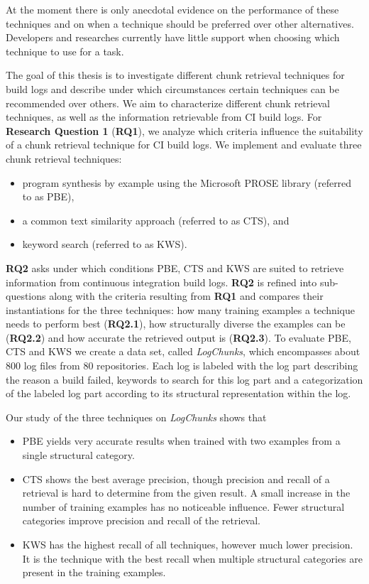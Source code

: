 \documentclass[\myrootdir/main.tex]{subfiles}
\begin{document}
At the moment there is only anecdotal evidence on the performance of these techniques and on when a technique should be preferred over other alternatives.
Developers and researches currently have little support when choosing which technique to use for a task.

The goal of this thesis is to investigate different chunk retrieval techniques for build logs and describe under which circumstances certain techniques can be recommended over others.
We aim to characterize different chunk retrieval techniques, as well as the information retrievable from CI build logs.
For \textbf{Research Question 1} (\textbf{RQ1}), we analyze which criteria influence the suitability of a chunk retrieval technique for CI build logs.
We implement and evaluate three chunk retrieval techniques:
\begin{itemize}
  \item program synthesis by example using the Microsoft PROSE library (referred to as PBE),
  \item a common text similarity approach (referred to as CTS), and
  \item keyword search (referred to as KWS).
\end{itemize}
\textbf{RQ2} asks under which conditions PBE, CTS and KWS are suited to retrieve information from continuous integration build logs.
\textbf{RQ2} is refined into sub-questions along with the criteria resulting from \textbf{RQ1} and compares their instantiations for the three techniques:
how many training examples a technique needs to perform best (\textbf{RQ2.1}), how structurally diverse the examples can be (\textbf{RQ2.2}) and how accurate the retrieved output is (\textbf{RQ2.3}).
To evaluate PBE, CTS and KWS we create a data set, called \emph{LogChunks}, which encompasses about 800 log files from 80 repositories.
Each log is labeled with the log part describing the reason a build failed, keywords to search for this log part and a categorization of the labeled log part according to its structural representation within the log.

Our study of the three techniques on \emph{LogChunks} shows that
\begin{itemize}
  \item PBE yields very accurate results when trained with two examples from a single structural category.
  \item CTS shows the best average precision, though precision and recall of a retrieval is hard to determine from the given result.
  A small increase in the number of training examples has no noticeable influence.
  Fewer structural categories improve precision and recall of the retrieval.
  \item KWS has the highest recall of all techniques, however much lower precision.
  It is the technique with the best recall when multiple structural categories are present in the training examples.
\end{itemize}
\end{document}
